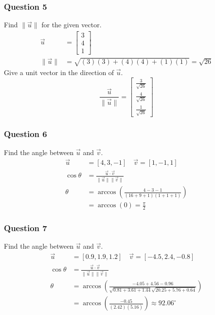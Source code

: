 \documentclass{math}
\begin{document}
\subsubsection*{Question 5}
Find \( \|\vec{u}\| \) for the given vector.
\begin{align*}
  \vec{u} &= \begin{bmatrix}3 \\ 4 \\ 1\end{bmatrix} \\
  \|\vec{u}\| &= \sqrt{(3)(3)+(4)(4)+(1)(1)} = \sqrt{26}
\end{align*}
Give a unit vector in the direction of \( \vec{u} \).
\[ \frac{\vec{u}}{\|\vec{u}\|} = \begin{bmatrix}
  \frac{3}{\sqrt{26}} \\ \frac{4}{\sqrt{26}} \\
  \frac{1}{\sqrt{26}}\end{bmatrix} \]

\subsubsection*{Question 6}
Find the angle between \( \vec{u} \) and \( \vec{v} \).
\begin{align*}
  \vec{u} &= [4,3,-1] \quad \vec{v} = [1,-1,1] \\
  \cos\theta &= \frac{\vec{u}\cdot\vec{v}}{\|\vec{u}\|\|\vec{v}\|} \\
  \theta &= \arccos(\frac{4-3-1}{(16+9+1)(1+1+1)}) \\
  &= \arccos(0) = \frac{\pi}{2}
\end{align*}

\subsubsection*{Question 7}
Find the angle between \( \vec{u} \) and \( \vec{v} \).
\begin{align*}
  \vec{u} &= [0.9,1.9,1.2] \quad \vec{v} = [-4.5,2.4,-0.8] \\
  \cos\theta &= \frac{\vec{u}\cdot\vec{v}}{\|\vec{u}\|\|\vec{v}\|} \\
  \theta &= \arccos(\frac{-4.05+4.56-0.96}
    {\sqrt{0.81+3.61+1.44}\sqrt{20.25+5.76+0.64}}) \\
  &= \arccos(\frac{-0.45}{(2.42)(5.16)}) \approx 92.06^{\circ}
\end{align*}
\end{document}

